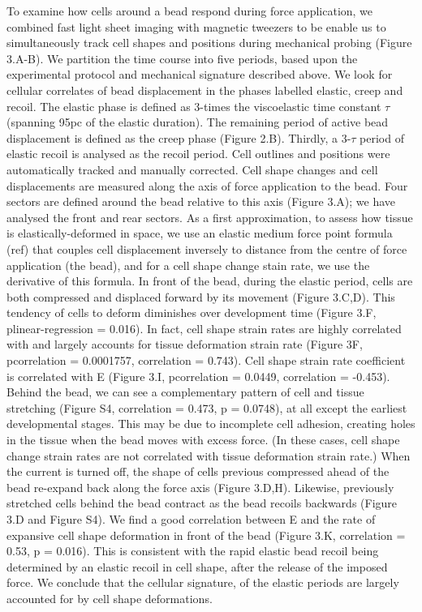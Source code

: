 To examine how cells around a bead respond during force application, we combined fast light sheet imaging with magnetic tweezers to be enable us to simultaneously track cell shapes and positions during mechanical probing (Figure 3.A-B).
We partition the time course into five periods, based upon the experimental protocol and mechanical signature described above.
We look for cellular correlates of bead displacement in the phases labelled elastic, creep and recoil.
The elastic phase is defined as 3-times the viscoelastic time constant $\tau$ (spanning 95pc of the elastic duration).
The remaining period of active bead displacement is defined as the creep phase (Figure 2.B).
Thirdly, a 3-$\tau$ period of elastic recoil is analysed as the recoil period.
Cell outlines and positions were automatically tracked and manually corrected.
Cell shape changes and cell displacements are measured along the axis of force application to the bead.
Four sectors are defined around the bead relative to this axis (Figure 3.A); we have analysed the front and rear sectors.
As a first approximation, to assess how tissue is elastically-deformed in space, we use an elastic medium force point formula (ref) that couples cell displacement inversely to distance from the centre of force application (the bead), and for a cell shape change stain rate, we use the derivative of this formula.
In front of the bead, during the elastic period, cells are both compressed and displaced forward by its movement (Figure 3.C,D).
This tendency of cells to deform diminishes over development time (Figure 3.F, plinear-regression = 0.016).
In fact, cell shape strain rates are highly correlated with and largely accounts for tissue deformation strain rate (Figure 3F, pcorrelation = 0.0001757, correlation = 0.743).
Cell shape strain rate coefficient is correlated with E (Figure 3.I, pcorrelation = 0.0449, correlation = -0.453).
Behind the bead, we can see a complementary pattern of cell and tissue stretching (Figure S4, correlation = 0.473, p = 0.0748), at all except the earliest developmental stages.
This may be due to incomplete cell adhesion, creating holes in the tissue when the bead moves with excess force.
(In these cases, cell shape change strain rates are not correlated with tissue deformation strain rate.)
When the current is turned off, the shape of cells previous compressed ahead of the bead re-expand back along the force axis (Figure 3.D,H).
Likewise, previously stretched cells behind the bead contract as the bead recoils backwards (Figure 3.D and Figure S4).
We find a good correlation between E and the rate of expansive cell shape deformation in front of the bead (Figure 3.K, correlation = 0.53, p = 0.016).
This is consistent with the rapid elastic bead recoil being determined by an elastic recoil in cell shape, after the release of the imposed force.
We conclude that the cellular signature, of the elastic periods are largely accounted for by cell shape deformations.

